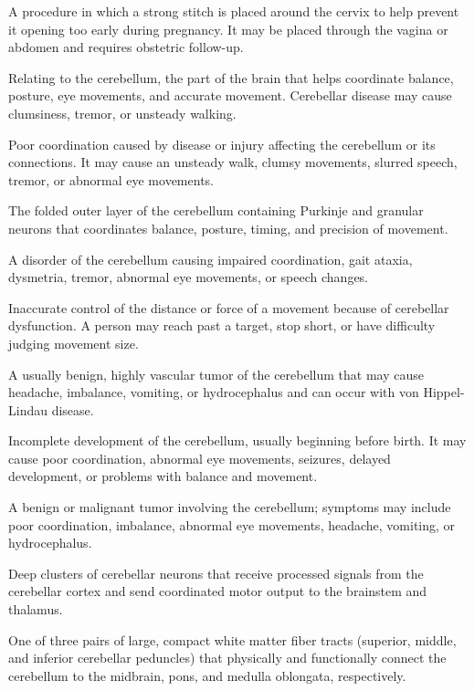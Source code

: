  A procedure in which a strong stitch is placed around the cervix to help prevent it opening too early during pregnancy. It may be placed through the vagina or abdomen and requires obstetric follow-up.

 Relating to the cerebellum, the part of the brain that helps coordinate balance, posture, eye movements, and accurate movement. Cerebellar disease may cause clumsiness, tremor, or unsteady walking.

 Poor coordination caused by disease or injury affecting the cerebellum or its connections. It may cause an unsteady walk, clumsy movements, slurred speech, tremor, or abnormal eye movements.

 The folded outer layer of the cerebellum containing Purkinje and granular neurons that coordinates balance, posture, timing, and precision of movement.

 A disorder of the cerebellum causing impaired coordination, gait ataxia, dysmetria, tremor, abnormal eye movements, or speech changes.

 Inaccurate control of the distance or force of a movement because of cerebellar dysfunction. A person may reach past a target, stop short, or have difficulty judging movement size.

 A usually benign, highly vascular tumor of the cerebellum that may cause headache, imbalance, vomiting, or hydrocephalus and can occur with von Hippel-Lindau disease.

 Incomplete development of the cerebellum, usually beginning before birth. It may cause poor coordination, abnormal eye movements, seizures, delayed development, or problems with balance and movement.

 A benign or malignant tumor involving the cerebellum; symptoms may include poor coordination, imbalance, abnormal eye movements, headache, vomiting, or hydrocephalus.

 Deep clusters of cerebellar neurons that receive processed signals from the cerebellar cortex and send coordinated motor output to the brainstem and thalamus.

 One of three pairs of large, compact white matter fiber tracts (superior, middle, and inferior cerebellar peduncles) that physically and functionally connect the cerebellum to the midbrain, pons, and medulla oblongata, respectively.

